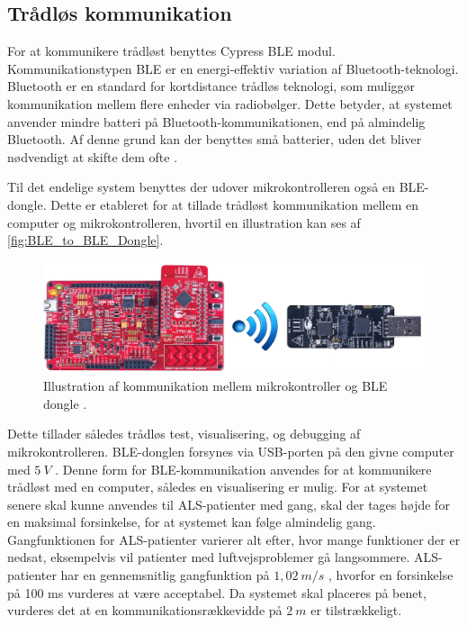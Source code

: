 \subsection{Trådløs kommunikation}\label{sec:traadloes_komm_design}
For at kommunikere trådløst benyttes Cypress BLE modul. Kommunikationstypen BLE \citep{cypressguide2014} er en energi-effektiv variation af Bluetooth-teknologi. Bluetooth er en standard for kortdistance trådløs teknologi, som muliggør kommunikation mellem flere enheder via radiobølger. Dette betyder, at systemet anvender mindre batteri på Bluetooth-kommunikationen, end på almindelig Bluetooth. Af denne grund kan der benyttes små batterier, uden det bliver nødvendigt at skifte dem ofte \citep{gupta2013}. 

\noindent
Til det endelige system benyttes der udover mikrokontrolleren også en BLE-dongle. Dette er etableret for at tillade trådløst kommunikation mellem en computer og mikrokontrolleren, hvortil en illustration kan ses af \autoref{fig:BLE_to_BLE_Dongle}. 

\begin{figure}[H]
	\centering
	\includegraphics[width=1\textwidth]{figures/BLEToBLEdongle}
	\caption{Illustration af kommunikation mellem mikrokontroller og BLE dongle \citep{cypresspsoc2015, cypressguide2014}.}
	\label{fig:BLE_to_BLE_Dongle}
\end{figure}


Dette tillader således trådløs test, visualisering, og debugging af mikrokontrolleren. BLE-donglen forsynes via USB-porten på den givne computer med $5~V$ \citep{cypressguide2014}. Denne form for BLE-kommunikation anvendes for at kommunikere trådløst med en computer, således en visualisering er mulig. For at systemet senere skal kunne anvendes til ALS-patienter med gang, skal der tages højde for en maksimal forsinkelse, for at systemet kan følge almindelig gang. Gangfunktionen for ALS-patienter varierer alt efter, hvor mange funktioner der er nedsat, eksempelvis vil patienter med luftvejsproblemer gå langsommere. ALS-patienter har en gennemsnitlig gangfunktion på $1,02~m/s$ \citep{hausdorff2000}, hvorfor en forsinkelse på 100 ms vurderes at være acceptabel. Da systemet skal placeres på benet, vurderes det at en kommunikationsrækkevidde på $2~m$ er tilstrækkeligt.
\\

